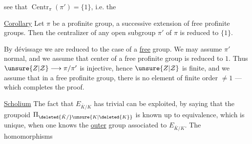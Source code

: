 see that $\operatorname{Centr}_{\pi}(\pi')=\{1\}$, i.e. the

\uline{Corollary} Let $\pi$ be a profinite group, a successive extension of free profinite groups. Then the centralizer  of any open subgroup $\pi'$ of $\pi$ is reduced to $\{1\}$.

By dévissage we are reduced to the case of a \uline{free}  group.  We may assume $\pi'$ normal, and we assume that  center of a free profinite group is reduced to $1$.
Thus $\unsure{Z|\mathcal Z}\longrightarrow\pi/\pi'$ is injective, hence $\unsure{Z|\mathcal Z}$ is finite, and we assume that in a free profinite group, there is no element of finite order $\neq1$  --- which completes the proof.

\uline{Scholium} The fact that $E_{\bar K/K}$ has  trivial  can be exploited, by saying that the groupoid $\Pi_{\deleted{\bar K/}\unsure{K|\deleted{K}}}$  is known up to equivalence,  which is unique, when one knows the \uline{outer} group associated to $E_{\bar K/K}$. The homomorphisms
